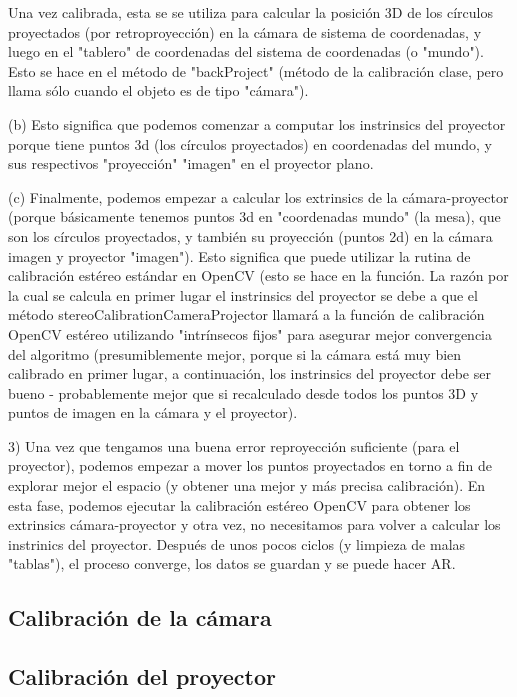 Una vez calibrada, esta se se utiliza para calcular la posición 3D de los círculos proyectados (por retroproyección) en la cámara de sistema de coordenadas, y luego en el "tablero" de coordenadas del sistema de coordenadas (o "mundo"). Esto se hace en el método de "backProject" (método de la calibración clase, pero llama sólo cuando el objeto es de tipo "cámara"). 

(b) Esto significa que podemos comenzar a computar los instrinsics del proyector porque tiene puntos 3d (los círculos proyectados) en coordenadas del mundo, y sus respectivos "proyección" "imagen" en el proyector plano. 

(c) Finalmente, podemos empezar a calcular los extrinsics de la cámara-proyector (porque básicamente tenemos puntos 3d en "coordenadas mundo" (la mesa), que son los círculos proyectados, y también su proyección (puntos 2d) en la cámara imagen y proyector "imagen"). Esto significa que puede utilizar la rutina de calibración estéreo estándar en OpenCV (esto se hace en la función. La razón por la cual se calcula en primer lugar el instrinsics del proyector se debe a que el método stereoCalibrationCameraProjector llamará a la función de calibración OpenCV estéreo utilizando "intrínsecos fijos" para asegurar mejor convergencia del algoritmo (presumiblemente mejor, porque si la cámara está muy bien calibrado en primer lugar, a continuación, los instrinsics del proyector debe ser bueno - probablemente mejor que si recalculado desde todos los puntos 3D y puntos de imagen en la cámara y el proyector). 

3) Una vez que tengamos una buena error reproyección suficiente (para el proyector), podemos empezar a mover los puntos proyectados en torno a fin de explorar mejor el espacio (y obtener una mejor y más precisa calibración). En esta fase, podemos ejecutar la calibración estéreo OpenCV para obtener los extrinsics cámara-proyector y otra vez, no necesitamos para volver a calcular los instrinics del proyector. Después de unos pocos ciclos (y limpieza de malas "tablas"), el proceso converge, los datos se guardan y se puede hacer AR. 





\subsection{Calibración de la cámara}

\subsection{Calibración del proyector}

